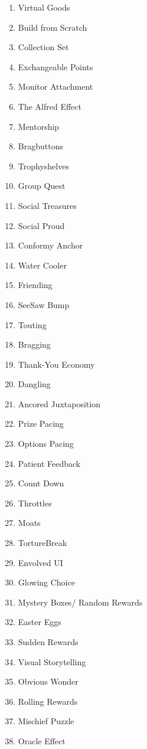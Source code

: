 \begin{multicols}{2}
\begin{enumerate}
        \item Virtual Goods
        \item Build from Scratch
        \item Collection Set
        \item Exchangeable Points
        \item Monitor Attachment
        \item The Alfred Effect
        \item Mentorship
        \item Bragbuttons
        \item Trophyshelves
        \item Group Quest
        \item Social Treasures
        \item Social Proud
        \item Conformy Anchor
        \item Water Cooler
        \item Friending
        \item SeeSaw Bump
        \item Touting
        \item Bragging
        \item Thank-You Economy
        \item Dangling
        \item Ancored Juxtaposition
        \item Prize Pacing
        \item Options Pacing
        \item Patient Feedback
        \item Count Down
        \item Throttles
        \item Moats
        \item TortureBreak
        \item Envolved UI
        \item Glowing Choice
        \item Mystery Boxes/ Random Rewards
        \item Easter Eggs
        \item Sudden Rewards
        \item Visual Storytelling
        \item Obvious Wonder
        \item Rolling Rewards
        \item Mischief Puzzle
        \item Oracle Effect

\end{enumerate}
\end{multicols}
